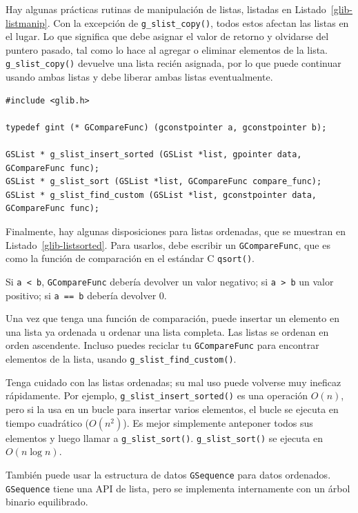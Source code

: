 Hay algunas prácticas rutinas de manipulación de listas, listadas en Listado~\ref{glib-listmanip}. Con la excepción de \lstinline{g_slist_copy()}, todos estos afectan las listas en el lugar. Lo que significa que debe asignar el valor de retorno y olvidarse del puntero pasado, tal como lo hace al agregar o eliminar elementos de la lista. \lstinline{g_slist_copy()} devuelve una lista recién asignada, por lo que puede continuar usando ambas listas y debe liberar ambas listas eventualmente.

\begin{lstlisting}[style=GLib/GTK, caption={Listas ordenadas}, label=glib-listsorted]
#include <glib.h>

typedef gint (* GCompareFunc) (gconstpointer a, gconstpointer b);

GSList * g_slist_insert_sorted (GSList *list, gpointer data, GCompareFunc func);
GSList * g_slist_sort (GSList *list, GCompareFunc compare_func);
GSList * g_slist_find_custom (GSList *list, gconstpointer data, GCompareFunc func);
\end{lstlisting}

Finalmente, hay algunas disposiciones para listas ordenadas, que se muestran en Listado~\ref{glib-listsorted}. Para usarlos, debe escribir un \lstinline{GCompareFunc}, que es como la función de comparación en el estándar C \lstinline{qsort()}.

Si \lstinline{a < b}, \lstinline{GCompareFunc} debería devolver un valor negativo; si \lstinline{a > b} un valor positivo; si \lstinline{a == b} debería devolver 0.

Una vez que tenga una función de comparación, puede insertar un elemento en una lista ya ordenada u ordenar una lista completa. Las listas se ordenan en orden ascendente. Incluso puedes reciclar tu \lstinline{GCompareFunc} para encontrar elementos de la lista, usando \lstinline{g_slist_find_custom()}.

Tenga cuidado con las listas ordenadas; su mal uso puede volverse muy ineficaz rápidamente. Por ejemplo, \lstinline{g_slist_insert_sorted()} es una operación $O(n)$, pero si la usa en un bucle para insertar varios elementos, el bucle se ejecuta en tiempo cuadrático ($O(n^2)$). Es mejor simplemente anteponer todos sus elementos y luego llamar a \lstinline{g_slist_sort()}. \lstinline{g_slist_sort()} se ejecuta en $O(n \log n)$.

También puede usar la estructura de datos \lstinline{GSequence} para datos ordenados. \lstinline{GSequence} tiene una API de lista, pero se implementa internamente con un árbol binario equilibrado.

